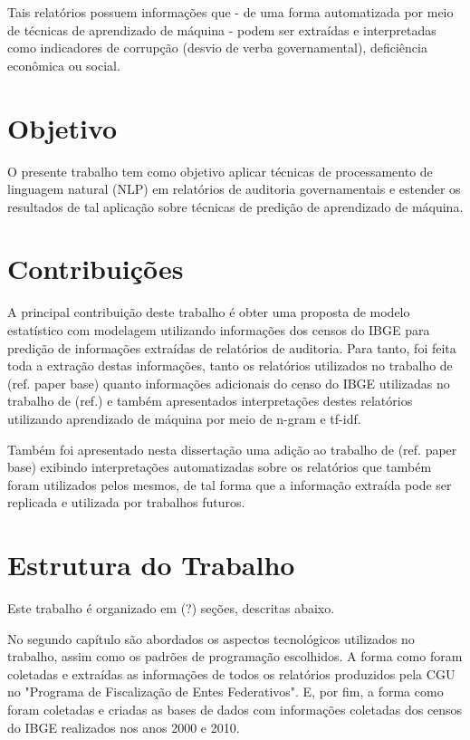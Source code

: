 Tais relatórios possuem informações que - de uma forma automatizada por meio de técnicas de aprendizado de máquina - podem ser extraídas e interpretadas como indicadores de corrupção (desvio de verba governamental), deficiência econômica ou social.

\section{Objetivo}
\label{sec:objetivo}

O presente trabalho tem como objetivo aplicar técnicas de processamento de linguagem natural (NLP) em relatórios de auditoria governamentais e estender os resultados de tal aplicação sobre técnicas de predição de aprendizado de máquina.

\section{Contribuições}
\label{sec:contribuicoes}

A principal contribuição deste trabalho é obter uma proposta de modelo estatístico com modelagem utilizando informações dos censos do IBGE para predição de informações extraídas de relatórios de auditoria. Para tanto, foi feita toda a extração destas informações, tanto os relatórios utilizados no trabalho de (ref. paper base) quanto informações adicionais do censo do IBGE utilizadas no trabalho de (ref.) e também apresentados interpretações destes relatórios utilizando aprendizado de máquina por meio de n-gram e tf-idf.

Também foi apresentado nesta dissertação uma adição ao trabalho de (ref. paper base) exibindo interpretações automatizadas sobre os relatórios que também foram utilizados pelos mesmos, de tal forma que a informação extraída pode ser replicada e utilizada por trabalhos futuros.

\section{Estrutura do Trabalho}
\label{sec:estrutura_do_trabalho}

Este trabalho é organizado em (?) seções, descritas abaixo.

No segundo capítulo são abordados os aspectos tecnológicos utilizados no trabalho, assim como os padrões de programação escolhidos. A forma como foram coletadas e extraídas as informações de todos os relatórios produzidos pela CGU no "Programa de Fiscalização de Entes Federativos". E, por fim, a forma como foram coletadas e criadas as bases de dados com informações coletadas dos censos do IBGE realizados nos anos 2000 e 2010.

